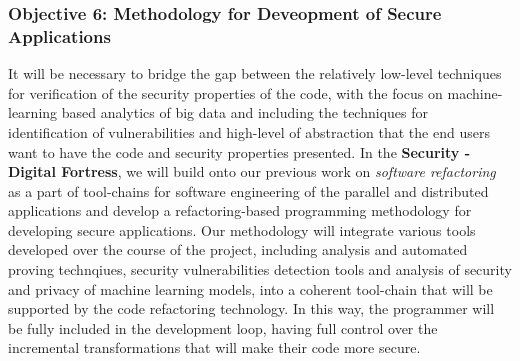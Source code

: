 \documentclass[a4paper,11pt]{article}
\newcommand{\project}[1]{\textbf{#1}\xspace}
\newcommand{\SECURITY}{\project{Security - Digital Fortress}}
\newcommand{\TheProject}{\SECURITY}
\begin{document}
\subsubsection*{Objective 6: Methodology for Deveopment of Secure Applications}
\vspace{-6pt}

It will be necessary to bridge the gap between the relatively low-level techniques for verification of the security properties of the code, with the focus on machine-learning based analytics of big data and including the techniques for identification of vulnerabilities and high-level of abstraction that the end users want to have the code and security properties presented. In the \TheProject{}, we will build onto our previous work on \emph{software refactoring} as a part of tool-chains for software engineering of the parallel and distributed applications and develop a refactoring-based programming methodology for developing secure applications. Our methodology will integrate various tools developed over the course of the project, including analysis and automated proving technqiues, security vulnerabilities detection tools and analysis of security and privacy of machine learning models, into a coherent tool-chain that will be supported by the code refactoring technology. In this way, the programmer will be fully included in the development loop, having full control over the incremental transformations that will make their code more secure.

\end{document}
